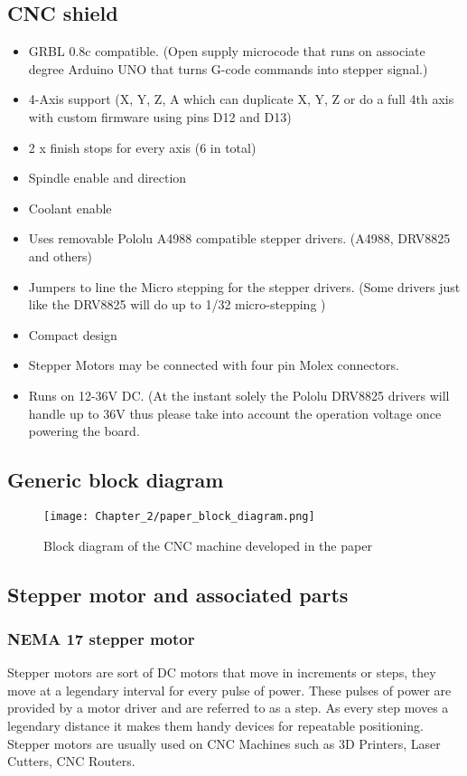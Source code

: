 \subsection{CNC shield}
\begin{itemize}
 \item GRBL 0.8c compatible. (Open supply microcode that runs on associate degree Arduino UNO that turns G-code commands into stepper signal.)
 \item 4-Axis support (X, Y, Z, A which can duplicate X, Y, Z or do a full 4th axis with custom firmware using pins D12 and D13)
 \item 2 x finish stops for every axis (6 in total)
 \item Spindle enable and direction
 \item Coolant enable
 \item Uses removable Pololu A4988 compatible stepper drivers. (A4988, DRV8825 and others)
 \item Jumpers to line the Micro stepping for the stepper drivers. (Some drivers just like the DRV8825 will do up to 1/32 micro-stepping )
 \item Compact design
 \item Stepper Motors may be connected with four pin Molex connectors.
 \item Runs on 12-36V DC. (At the instant solely the Pololu DRV8825 drivers will handle up to 36V thus please take into account the operation voltage once powering the board.
\end{itemize}

\subsection{Generic block diagram}

\begin{figure}[h]
 \centering
 \texttt{[image: Chapter\_2/paper\_block\_diagram.png]}
 \caption{Block diagram of the CNC machine developed in the paper}
 \label{fig:block_diagram}
\end{figure}

\subsection{Stepper motor and associated parts}

\subsubsection*{NEMA 17 stepper motor}
Stepper motors are sort of DC motors that move in increments or steps, they move at a legendary interval for every pulse of power. These pulses of power are provided by a motor driver and are referred to as a step. As every step moves a legendary distance it makes them handy devices for repeatable positioning. Stepper motors are usually used on CNC Machines such as 3D Printers, Laser Cutters, CNC Routers.


